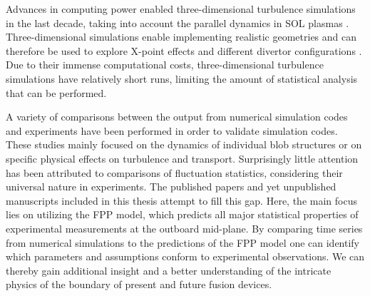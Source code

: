 Advances in computing power enabled three-dimensional turbulence simulations in the last
decade, taking into account the parallel dynamics in SOL plasmas
\cite{naulin2005shear,ricci2012simulation,tamain20143d,easy2016investigation,dudson2017hermes,stegmeir2018grillix,Nicholas2021comparing}.
Three-dimensional simulations enable implementing realistic geometries and can therefore
be used to explore X-point effects and different divertor configurations
\cite{nespoli20193d,riva2019three}. Due to their immense computational costs,
three-dimensional turbulence simulations have relatively short runs, limiting the amount
of statistical analysis that can be performed.

A variety of comparisons between the output from numerical simulation codes and
experiments have been performed in order to validate simulation codes. These studies
mainly focused on the dynamics of individual blob structures or on specific physical
effects on turbulence and transport. Surprisingly little attention has been attributed
to comparisons of fluctuation statistics, considering their universal nature in
experiments. The published papers and yet unpublished manuscripts included in this
thesis attempt to fill this gap. Here, the main focus lies on utilizing the FPP model,
which predicts all major statistical properties of experimental measurements at the
outboard mid-plane. By comparing time series from numerical simulations to the
predictions of the FPP model one can identify which parameters and assumptions conform
to experimental observations. We can thereby gain additional insight and a better
understanding of the intricate physics of the boundary of present and future fusion
devices.

